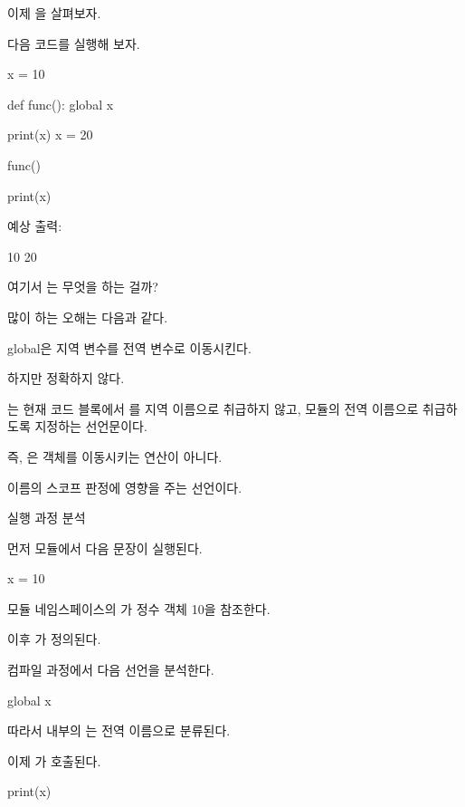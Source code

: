 이제 을 살펴보자.

다음 코드를 실행해 보자.

\begin{dhkcode}
x = 10

def func():
    global x

    print(x)
    x = 20

func()

print(x)
\end{dhkcode}

예상 출력:

\begin{dhkzsh}
10
20
\end{dhkzsh}

여기서 는 무엇을 하는 걸까?

많이 하는 오해는 다음과 같다.

\begin{dhksmry}[centered]
global은 지역 변수를 전역 변수로 이동시킨다.
\end{dhksmry}

하지만 정확하지 않다.

는 현재 코드 블록에서 를 지역 이름으로 취급하지 않고, 모듈의 전역 이름으로 취급하도록 지정하는 선언문이다.

즉, 은 객체를 이동시키는 연산이 아니다.

이름의 스코프 판정에 영향을 주는 선언이다.

\begin{dhknote}
\begin{dhksmry}[centered]
실행 과정 분석
\end{dhksmry}
\end{dhknote}

먼저 모듈에서 다음 문장이 실행된다.

\begin{dhkcode}
x = 10
\end{dhkcode}

모듈 네임스페이스의 가 정수 객체 10을 참조한다.

이후 가 정의된다.

컴파일 과정에서 다음 선언을 분석한다.

\begin{dhkcode}
global x
\end{dhkcode}

따라서  내부의 는 전역 이름으로 분류된다.

이제 가 호출된다.

\begin{dhkcode}
print(x)
\end{dhkcode}

